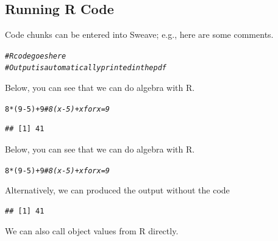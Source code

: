 \documentclass{article}\usepackage[]{graphicx}\usepackage[]{xcolor}
\makeatletter
\newcommand{\hlnum}[1]{\textcolor[rgb]{0.686,0.059,0.569}{#1}}%
\newcommand{\hlcom}[1]{\textcolor[rgb]{0.678,0.584,0.686}{\textit{#1}}}%
\newcommand{\hlopt}[1]{\textcolor[rgb]{0,0,0}{#1}}%
\newcommand{\hldef}[1]{\textcolor[rgb]{0.345,0.345,0.345}{#1}}%
\newenvironment{kframe}{%
 \def\at@end@of@kframe{}%
 \ifinner\ifhmode%
  \def\at@end@of@kframe{\end{minipage}}%
  \begin{minipage}{\columnwidth}%
 \fi\fi%
 \def\FrameCommand##1{\hskip\@totalleftmargin \hskip-\fboxsep
 \colorbox{shadecolor}{##1}\hskip-\fboxsep
     \hskip-\linewidth \hskip-\@totalleftmargin \hskip\columnwidth}%
 \MakeFramed {\advance\hsize-\width
   \@totalleftmargin\z@ \linewidth\hsize
   \@setminipage}}%
 {\par\unskip\endMakeFramed%
 \at@end@of@kframe}
\newenvironment{knitrout}{}{} %
\makeatother
\begin{document}
\begin{multicols}{2}
\subsection{Running R Code}
Code chunks can be entered into Sweave; e.g., here are some comments.
\begin{knitrout}\scriptsize
{}\color{fgcolor}\begin{kframe}
\begin{alltt}
\hlcom{# R code goes here}
\hlcom{# Output is automatically printed in the pdf}
\end{alltt}
\end{kframe}
\end{knitrout}
\indent Below, you can see that we can do algebra with R.
\begin{knitrout}\scriptsize
{}\color{fgcolor}\begin{kframe}
\begin{alltt}
\hlnum{8}\hlopt{*}\hldef{(}\hlnum{9}\hlopt{-}\hlnum{5}\hldef{)} \hlopt{+} \hlnum{9} \hlcom{# 8(x-5) + x for x = 9}
\end{alltt}
\begin{verbatim}
## [1] 41
\end{verbatim}
\end{kframe}
\end{knitrout}
\indent Below, you can see that we can do algebra with R.
\begin{knitrout}\scriptsize
{}\color{fgcolor}\begin{kframe}
\begin{alltt}
\hlnum{8}\hlopt{*}\hldef{(}\hlnum{9}\hlopt{-}\hlnum{5}\hldef{)} \hlopt{+} \hlnum{9} \hlcom{# 8(x-5) + x for x = 9}
\end{alltt}
\end{kframe}
\end{knitrout}
\indent Alternatively, we can produced the output without the code
\begin{knitrout}\scriptsize
{}\color{fgcolor}\begin{kframe}
\begin{verbatim}
## [1] 41
\end{verbatim}
\end{kframe}
\end{knitrout}
\indent We can also call object values from R directly.
\begin{knitrout}\scriptsize

\end{knitrout}
\end{multicols}
\end{document}
